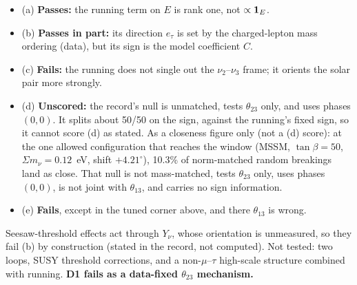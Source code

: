 \begin{itemize}
\item (a) \textbf{Passes:} the running term on $E$ is rank one, not $\propto\mathbf 1_E$.
\item (b) \textbf{Passes in part:} its direction $e_\tau$ is set by the charged-lepton mass
  ordering (data), but its sign is the model coefficient $C$.
\item (c) \textbf{Fails:} the running does not single out the $\nu_2$--$\nu_3$ frame; it orients the
  solar pair more strongly.
\item (d) \textbf{Unscored:} the record's null is unmatched, tests $\theta_{23}$ only, and uses
  phases $(0,0)$. It splits about 50/50 on the sign, against the running's fixed sign, so it cannot
  score (d) as stated.
  As a closeness figure only (not a (d) score): at the one allowed configuration that reaches the
  window (MSSM, $\tan\beta=50$, $\Sigma m_\nu=0.12$~eV, shift $+4.21^\circ$), 10.3\% of
  norm-matched random breakings land as close. That null is not mass-matched, tests $\theta_{23}$
  only, uses phases $(0,0)$, is not joint with $\theta_{13}$, and carries no sign information.
\item (e) \textbf{Fails}, except in the tuned corner above, and there $\theta_{13}$ is wrong.
\end{itemize}
Seesaw-threshold effects act through $Y_\nu$, whose orientation is unmeasured, so they fail (b) by
construction (stated in the record, not computed). Not tested: two loops, SUSY threshold
corrections, and a non-$\mu$--$\tau$ high-scale structure combined with running.
\textbf{D1 fails as a data-fixed $\theta_{23}$ mechanism.}

